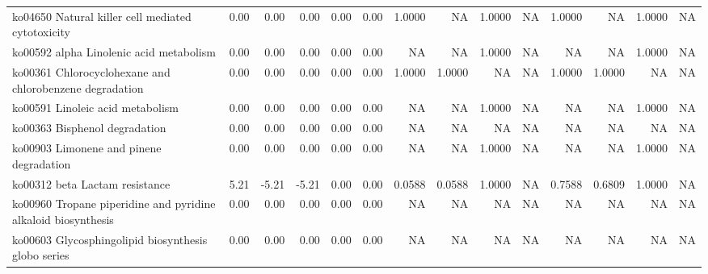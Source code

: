 {\begin{landscape}
\begin{longtable}{ | l | r | r | r | r | r | r  | r | r | r | r | r | r  | r  |}
			ko04650  Natural killer cell mediated cytotoxicity & 0.00 & 0.00 & 0.00 & 0.00 & 0.00 & 1.0000 & NA & 1.0000 & NA & 1.0000 & NA & 1.0000 & NA \\ 
			ko00592  alpha Linolenic acid metabolism & 0.00 & 0.00 & 0.00 & 0.00 & 0.00 & NA & NA & 1.0000 & NA & NA & NA & 1.0000 & NA \\ 
			ko00361  Chlorocyclohexane and chlorobenzene degradation & 0.00 & 0.00 & 0.00 & 0.00 & 0.00 & 1.0000 & 1.0000 & NA & NA & 1.0000 & 1.0000 & NA & NA \\ 
			ko00591  Linoleic acid metabolism & 0.00 & 0.00 & 0.00 & 0.00 & 0.00 & NA & NA & 1.0000 & NA & NA & NA & 1.0000 & NA \\ 
			ko00363  Bisphenol degradation & 0.00 & 0.00 & 0.00 & 0.00 & 0.00 & NA & NA & NA & NA & NA & NA & NA & NA \\ 
			ko00903  Limonene and pinene degradation & 0.00 & 0.00 & 0.00 & 0.00 & 0.00 & NA & NA & 1.0000 & NA & NA & NA & 1.0000 & NA \\ 
			ko00312  beta Lactam resistance & 5.21 & -5.21 & -5.21 & 0.00 & 0.00 & 0.0588 & 0.0588 & 1.0000 & NA & 0.7588 & 0.6809 & 1.0000 & NA \\ 
			ko00960  Tropane piperidine and pyridine alkaloid biosynthesis & 0.00 & 0.00 & 0.00 & 0.00 & 0.00 & NA & NA & NA & NA & NA & NA & NA & NA \\ 
			ko00603  Glycosphingolipid biosynthesis globo series & 0.00 & 0.00 & 0.00 & 0.00 & 0.00 & NA & NA & NA & NA & NA & NA & NA & NA
			
		\end{longtable}
	\end{landscape}
}




